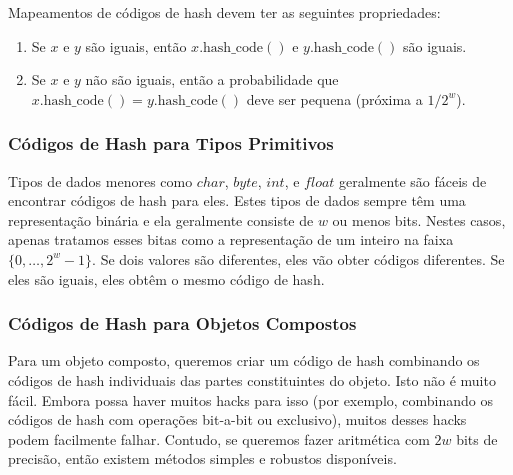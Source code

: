 \documentclass{beamer}
\begin{document}
\begin{frame}
Mapeamentos de códigos de hash devem ter as seguintes propriedades:

\begin{enumerate}
  \item Se \ensuremath{\ensuremath{x}} e \ensuremath{\ensuremath{y}} são iguais, então \ensuremath{\ensuremath{x.\mathrm{hash\_code}()}} e \ensuremath{\ensuremath{y.\mathrm{hash\_code}()}}
  são iguais.

  \item Se \ensuremath{\ensuremath{x}} e \ensuremath{\ensuremath{y}} não são iguais, então a probabilidade que
  $\ensuremath{\ensuremath{x.\mathrm{hash\_code}()}}=\ensuremath{\ensuremath{y.\mathrm{hash\_code}()}}$ deve ser pequena (próxima a
  $1/2^w$).
\end{enumerate}
\end{frame}

\begin{frame}
\frametitle{Códigos de Hash para Tipos Primitivos}
Tipos de dados menores como \ensuremath{\ensuremath{\ensuremath{\mathit{char}}}}, \ensuremath{\ensuremath{\ensuremath{\mathit{byte}}}}, \ensuremath{\ensuremath{\ensuremath{\mathit{int}}}}, e \ensuremath{\ensuremath{\ensuremath{\mathit{float}}}} geralmente são fáceis de encontrar códigos de hash para eles.  Estes tipos de dados sempre têm uma representação binária e ela geralmente consiste de
\ensuremath{\ensuremath{w}} ou menos bits. Nestes casos, apenas tratamos esses bitas como a representação de um inteiro na faixa $\{0,\ldots,2^\ensuremath{\ensuremath{w}}-1\}$.  Se dois valores são diferentes, eles vão obter códigos diferentes.  Se eles são iguais, eles obtêm o mesmo código de hash.
\end{frame}

\begin{frame}
\frametitle{Códigos de Hash para Objetos Compostos}
Para um objeto composto, queremos criar um código de hash combinando os códigos de hash individuais das partes constituintes do objeto.  Isto não é muito fácil.  Embora possa haver muitos hacks para isso (por exemplo, combinando os códigos de hash com operações bit-a-bit ou exclusivo), muitos desses hacks podem facilmente falhar.
Contudo, se queremos fazer aritmética com  $2\ensuremath{\ensuremath{w}}$ bits de precisão, então existem métodos simples e robustos disponíveis.
\end{frame}
\end{document}
